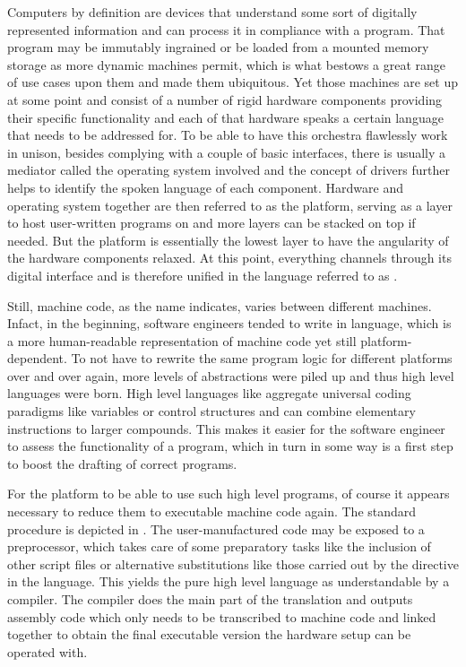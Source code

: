 Computers by definition are devices that understand some sort of digitally represented information and can process it in compliance with a program. That program may be immutably ingrained or be loaded from a mounted memory storage as more dynamic machines permit, which is what bestows a great range of use cases upon them and made them ubiquitous. Yet those machines are set up at some point and consist of a number of rigid hardware components providing their specific functionality and each of that hardware speaks a certain language that needs to be addressed for. To be able to have this orchestra flawlessly work in unison, besides complying with a couple of basic interfaces, there is usually a mediator called the operating system involved and the concept of drivers further helps to identify the spoken language of each component. Hardware and operating system together are then referred to as the platform, serving as a layer to host user-written programs on and more layers can be stacked on top if needed. But the platform is essentially the lowest layer to have the angularity of the hardware components relaxed. At this point, everything channels through its digital interface and is therefore unified in the language referred to as .

Still, machine code, as the name indicates, varies between different machines. Infact, in the beginning, software engineers tended to write in  language, which is a more human-readable representation of machine code yet still platform-dependent. To not have to rewrite the same program logic for different platforms over and over again, more levels of abstractions were piled up and thus high level languages were born. High level languages like  aggregate universal coding paradigms like variables or control structures and can combine elementary instructions to larger compounds. This makes it easier for the software engineer to assess the functionality of a program, which in turn in some way is a first step to boost the drafting of correct programs.

For the platform to be able to use such high level programs, of course it appears necessary to reduce them to executable machine code again. The standard procedure is depicted in . The user-manufactured code may be exposed to a preprocessor, which takes care of some preparatory tasks like the inclusion of other script files or alternative substitutions like those carried out by the  directive in the  language. This yields the pure high level language as understandable by a compiler. The compiler does the main part of the translation and outputs assembly code which only needs to be transcribed to machine code and linked together to obtain the final executable version the hardware setup can be operated with.

